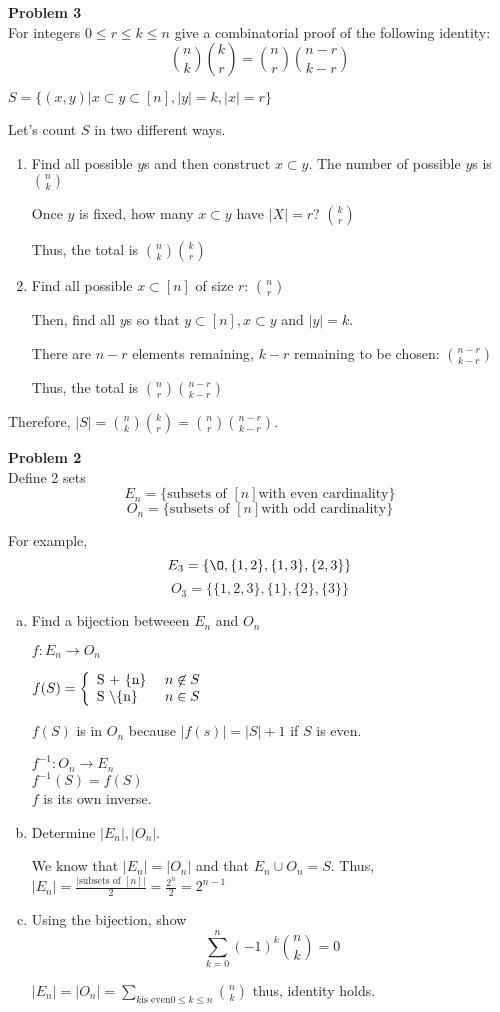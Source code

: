 \documentclass{article}
\newcommand{\func}[3][f]{$#1: #2 \rightarrow #3$}
\newcommand{\union}{\cup}
\begin{document}
\textbf{Problem 3}\\
 For integers $0 \le r \le k \le n$ give a combinatorial proof of the following identity: $$\binom nk \binom kr = \binom nr \binom {n-r}{k-r}$$
 
 $S = \{(x,y) | x \subset y \subset [n], |y| = k, |x| = r \}$
 
 Let's count $S$ in two different ways.
 \begin{enumerate}
 	\item Find all possible $y$s and then construct $x \subset y$.
	 	The number of possible $y$s is $\binom nk$
	 	
	 	Once $y$ is fixed, how many $x \subset y$ have $|X| = r$? $\binom kr$
	 	
	 	Thus, the total is $\binom nk \binom kr$
	 	
	 \item Find all possible $x \subset [n]$ of size $r$: $\binom nr$
	 
		 Then, find all $y$s so that $y \subset [n], x \subset y$ and $|y| = k$.
		 
		 There are $n-r$ elements remaining, $k-r$ remaining to be chosen: $\binom {n-r}{k-r}$
		 
		 Thus, the total is $\binom nr \binom {n-r}{k-r}$
 \end{enumerate}
 
 Therefore, $|S| = \binom nk \binom kr = \binom nr \binom {n-r}{k-r}$.
 
 
\textbf{Problem 2}\\
Define 2 sets
$$E_n = \{\text{subsets of } [n] \text{with even cardinality} \}$$
$$O_n = \{\text{subsets of } [n] \text{with odd cardinality} \}$$

For example, 
$$E_3 = \{\O, \{1,2\}, \{1,3\}, \{2,3\} \}$$
$$O_3 = \{\{1,2,3\}, \{1\}, \{2\}, \{3\} \}$$

\begin{enumerate}[a)]	
	\item Find a bijection betweeen $E_n$ and $O_n$
	
		\func{E_n}{O_n}
		
		$f(S) = 
		\piecewise{$S + \{n\} $}
		{$n \not\in S$}
		{$S \textbackslash \{n\} $}
		{$n \in S$}$
		
		$f(S)$ is in $O_n$ because $|f(s)| = |S|+1$ if $S$ is even.
		
		\func[f^{-1}]{O_n}{E_n}\\
		$f^{-1}(S) = f(S)$\\
		$f$ is its own inverse.
		
	\item Determine $|E_n|, |O_n|$.
	
		We know that $|E_n| = |O_n|$ and that $E_n \union O_n = S$. Thus, $|E_n| = \frac{|\text{subsets of } [n]|}{2} = \frac{2^n}{2} = 2^{n-1}$
	
	\item Using the bijection, show $$\sum_{k=0}^{n}(-1)^k \binom nk = 0$$
	
	$|E_n| = |O_n| = \sum_{k \text{is even} 0 \le k \le n} \binom nk$ thus, identity holds.
		
		
						
		
\end{enumerate}
 
\end{document}

